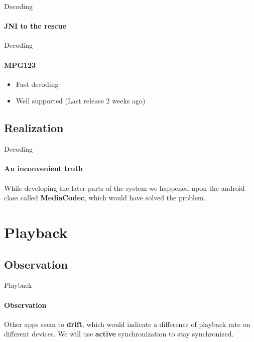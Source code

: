 \begin{frame}{Decoding}
	\framesubtitle{JNI to the rescue}
	\centering
\end{frame}

\begin{frame}{Decoding}
	\framesubtitle{MPG123}
	\begin{itemize}
		\item{Fast decoding}
		\item{Well supported (Last release 2 weeks ago)}
	\end{itemize}
\end{frame}

\subsection{Realization}

\begin{frame}{Decoding}
	\framesubtitle{An inconvenient truth}
	While developing the later parts of the system we happened upon the
	android class called \textbf{MediaCodec}, which would have solved
	the problem.
\end{frame}

\section{Playback}
\subsection{Observation}

\begin{frame}{Playback}
	\framesubtitle{Observation}
	Other apps seem to \textbf{drift}, which would indicate a difference
	of playback rate on different devices. We will use \textbf{active}
	synchronization to stay synchronized.
\end{frame}

